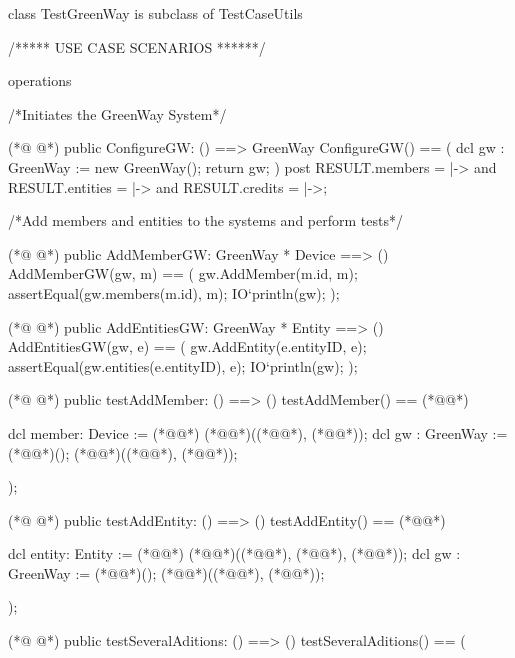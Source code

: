 \begin{vdmpp}
class TestGreenWay is subclass of TestCaseUtils


  /***** USE CASE SCENARIOS ******/

operations

  /*Initiates the GreenWay System*/
  
(*@
\label{ConfigureGW:10}
@*)
  public ConfigureGW: () ==> GreenWay
    ConfigureGW() == (
    dcl gw : GreenWay := new GreenWay();
    return gw;
    )   
  post RESULT.members = {|->}
       and RESULT.entities = {|->}
       and RESULT.credits = {|->};
       
  /*Add members and entities to the systems and perform tests*/
       
(*@
\label{AddMemberGW:21}
@*)
  public AddMemberGW: GreenWay * Device ==> ()
    AddMemberGW(gw, m) ==
    (
      gw.AddMember(m.id, m);      
      assertEqual(gw.members(m.id), m); 
      IO`println(gw);
      );  
      
(*@
\label{AddEntitiesGW:29}
@*)
  public AddEntitiesGW: GreenWay * Entity  ==> ()
    AddEntitiesGW(gw, e) ==
    (
      gw.AddEntity(e.entityID, e);      
      assertEqual(gw.entities(e.entityID), e);  
      IO`println(gw);
      );  
                  
      
(*@
\label{testAddMember:38}
@*)
  public testAddMember: () ==> ()
  testAddMember() == (*@\vdmnotcovered{(}@*)
  
    dcl member: Device := (*@@*) (*@@*)((*@@*), (*@@*));
    dcl gw : GreenWay := (*@@*)();
    (*@@*)((*@@*), (*@@*));  
          
  );
  
(*@
\label{testAddEntity:47}
@*)
  public testAddEntity: () ==> ()
  testAddEntity() == (*@\vdmnotcovered{(}@*)
  
    dcl entity: Entity := (*@@*) (*@@*)((*@@*), (*@@*), (*@@*));
    dcl gw : GreenWay := (*@@*)();
    (*@@*)((*@@*), (*@@*));  
          
  );
  
(*@
\label{testSeveralAditions:56}
@*)
  public testSeveralAditions: () ==> ()
  testSeveralAditions() == (
    

\end{vdmpp}
